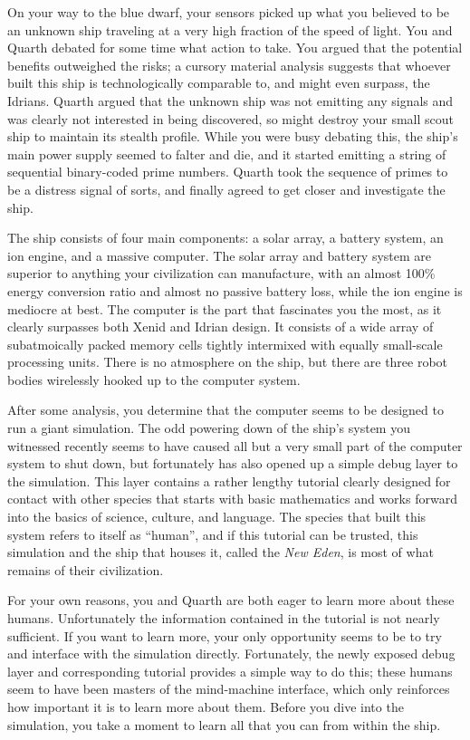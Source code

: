 \documentclass[char]{guildcamp1}
\begin{document}
On your way to the blue dwarf, your sensors picked up what you believed to be an unknown ship traveling at a very high fraction of the speed of light. You and Quarth debated for some time what action to take. You argued that the potential benefits outweighed the risks; a cursory material analysis suggests that whoever built this ship is technologically comparable to, and might even surpass, the Idrians. Quarth argued that the unknown ship was not emitting any signals and was clearly not interested in being discovered, so might destroy your small scout ship to maintain its stealth profile. While you were busy debating this, the ship's main power supply seemed to falter and die, and it started emitting a string of sequential binary-coded prime numbers. Quarth took the sequence of primes to be a distress signal of sorts, and finally agreed to get closer and investigate the ship.

The ship consists of four main components: a solar array, a battery system, an ion engine, and a massive computer. The solar array and battery system are superior to anything your civilization can manufacture, with an almost 100\% energy conversion ratio and almost no passive battery loss, while the ion engine is mediocre at best. The computer is the part that fascinates you the most, as it clearly surpasses both Xenid and Idrian design. It consists of a wide array of subatmoically packed memory cells tightly intermixed with equally small-scale processing units. There is no atmosphere on the ship, but there are three robot bodies wirelessly hooked up to the computer system.

After some analysis, you determine that the computer seems to be designed to run a giant simulation. The odd powering down of the ship's system you witnessed recently seems to have caused all but a very small part of the computer system to shut down, but fortunately has also opened up a simple debug layer to the simulation. This layer contains a rather lengthy tutorial clearly designed for contact with other species that starts with basic mathematics and works forward into the basics of science, culture, and language. The species that built this system refers to itself as ``human'', and if this tutorial can be trusted, this simulation and the ship that houses it, called the \emph{New Eden}, is most of what remains of their civilization.

For your own reasons, you and Quarth are both eager to learn more about these humans. Unfortunately the information contained in the tutorial is not nearly sufficient. If you want to learn more, your only opportunity seems to be to try and interface with the simulation directly. Fortunately, the newly exposed debug layer and corresponding tutorial provides a simple way to do this; these humans seem to have been masters of the mind-machine interface, which only reinforces how important it is to learn more about them. Before you dive into the simulation, you take a moment to learn all that you can from within the ship.
\end{document}
